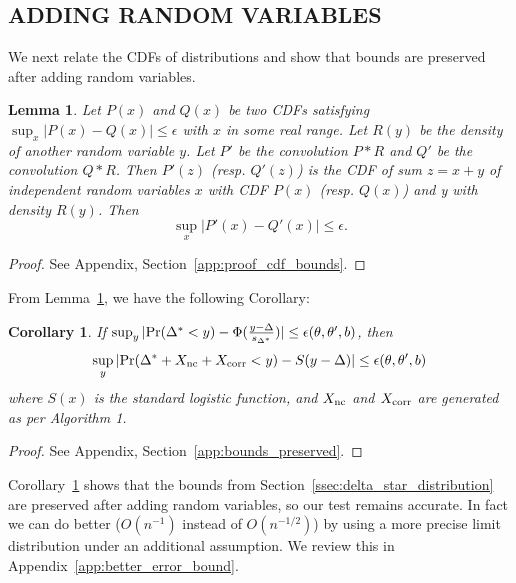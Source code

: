 \documentclass[letterpaper]{article}
\newtheorem{lemma}{Lemma}
\newtheorem{corollary}{Corollary}
\begin{document}
\subsection{ADDING RANDOM VARIABLES}\label{ssec:preserve_bounds}

We next relate the CDFs of distributions and show that bounds are preserved
after adding random variables.

\begin{lemma}\label{lem:cdf_bounds}
Let $P(x)$ and $Q(x)$ be two CDFs satisfying
$\sup_x|P(x)-Q(x)|\leq \epsilon$ with $x$ in some real range. Let $R(y)$ be the
{\em density} of another random variable $y$. Let $P'$ be the convolution $P*R$
and $Q'$ be the convolution $Q*R$. Then $P'(z)$ (resp. $Q'(z)$) is the CDF of
sum $z=x+y$ of independent random variables $x$ with CDF $P(x)$ (resp. $Q(x)$)
and y with density $R(y)$.  Then
\begin{equation}
    \sup_x|P'(x)-Q'(x)|\leq \epsilon.
\end{equation}
\end{lemma}
\begin{proof}
See Appendix, Section~\ref{app:proof_cdf_bounds}.
\end{proof}

From Lemma~\ref{lem:cdf_bounds}, we have the following Corollary:

\begin{corollary}\label{cor:bounds_preserved}
If $\sup_y|{\rm Pr}(\Delta^* < y) - \Phi(\frac{y-\Delta}{s_{\Delta^*}})|
\leq \epsilon(\theta,\theta',b)$, then
\[
    \sup_y|{\rm Pr}(\Delta^*+X_{\rm nc}+X_{\rm corr} < y) - S(y-\Delta)| \leq \epsilon(\theta,\theta',b)
\]
where $S(x)$ is the standard logistic function, and $X_{\rm nc}$ and $X_{\rm
corr}$ are generated as per Algorithm 1.
\end{corollary}

\begin{proof}
See Appendix, Section~\ref{app:bounds_preserved}.
\end{proof}

Corollary~\ref{cor:bounds_preserved} shows that the bounds from
Section~\ref{ssec:delta_star_distribution} are preserved after adding random
variables, so our test remains accurate.  In fact we can do better ($O(n^{-1})$
instead of $O(n^{-1/2})$) by using a more precise limit distribution under an
additional assumption. We review this in Appendix~\ref{app:better_error_bound}.
\end{document}
